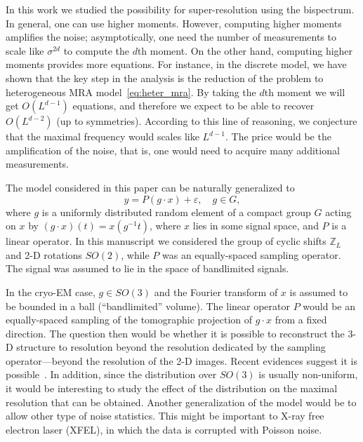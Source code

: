 \documentclass[english,12pt]{article}
\newcommand{\TODO}[1]{{\color{red}{[#1]}}}
\numberwithin{equation}{section}
\numberwithin{thm}{section} %
\begin{document}
In this work we studied the possibility for super-resolution using the bispectrum. In general, one can use higher moments. However, computing higher moments amplifies the noise; asymptotically, one need the number of measurements to scale like $\sigma^{2d}$ to compute the $d$th moment. On the other hand, computing higher moments provides more equations. For instance, in the discrete model, we have shown that the key step in the analysis is the reduction of the problem to heterogeneous MRA model~\eqref{eq:heter_mra}.  By taking the $d$th moment we will get  $O(L^{d-1})$ equations, and therefore we expect to be able to recover $O(L^{d-2})$ (up to symmetries). According to this line of reasoning, we conjecture that the maximal frequency would scales like $L^{d-1}$. The price would be the amplification of the noise, that is, one would need to acquire many additional measurements.  

The model considered in this paper can be naturally generalized to 
\begin{equation} \label{eq:general_model}
y = P (g\cdot x) + \varepsilon,\quad g\in G,
\end{equation}
where $g$ is a uniformly distributed random element of a compact group $G$ acting on $x$ by $(g\cdot x)(t) = x(g^{-1}t)$, where $x$ lies in some signal space, and $P$ is a linear operator.  In this manuscript we considered the group of cyclic shifts $\mathbb{Z}_L$ and 2-D rotations $SO(2)$, while $P$ was an equally-spaced sampling operator. The signal was assumed to lie in the space of bandlimited signals.  \TODO{Refs to papers on bispectrum for general groups}

In the cryo-EM case, $g\in SO(3)$ and the Fourier transform of $x$ is assumed to be bounded in a ball (``bandlimited'' volume). The linear operator $P$ would be an equally-spaced sampling of the tomographic projection of $g\cdot x$ from a fixed direction. The question then would be whether it is possible to reconstruct the 3-D structure to resolution beyond the resolution dedicated by the sampling operator---beyond the resolution of the 2-D images. Recent evidences suggest it is possible~\cite{chen2018single}. In addition, since the distribution over $SO(3)$ is usually non-uniform, it would be interesting to study the effect of the distribution on the maximal resolution that can be obtained. Another generalization of the model would be to allow other type of noise statistics. This might be important to X-ray free electron laser (XFEL), in which the data is corrupted with Poisson noise.
 
\end{document}
